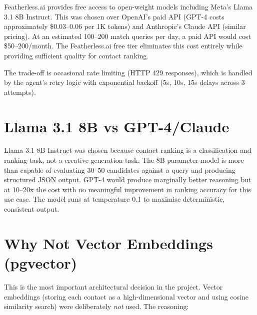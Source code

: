 \documentclass[12pt, a4paper]{report}
\begin{document}
Featherless.ai provides free access to open-weight models including Meta's Llama 3.1 8B Instruct. This was chosen over OpenAI's paid API (GPT-4 costs approximately \$0.03--0.06 per 1K tokens) and Anthropic's Claude API (similar pricing). At an estimated 100--200 match queries per day, a paid API would cost \$50--200/month. The Featherless.ai free tier eliminates this cost entirely while providing sufficient quality for contact ranking.

The trade-off is occasional rate limiting (HTTP 429 responses), which is handled by the agent's retry logic with exponential backoff (5s, 10s, 15s delays across 3 attempts).

\section{Llama 3.1 8B vs GPT-4/Claude}

Llama 3.1 8B Instruct was chosen because contact ranking is a classification and ranking task, not a creative generation task. The 8B parameter model is more than capable of evaluating 30--50 candidates against a query and producing structured JSON output. GPT-4 would produce marginally better reasoning but at 10--20x the cost with no meaningful improvement in ranking accuracy for this use case. The model runs at temperature 0.1 to maximise deterministic, consistent output.

\section{Why Not Vector Embeddings (pgvector)}

This is the most important architectural decision in the project. Vector embeddings (storing each contact as a high-dimensional vector and using cosine similarity search) were deliberately \emph{not} used. The reasoning:
\end{document}
